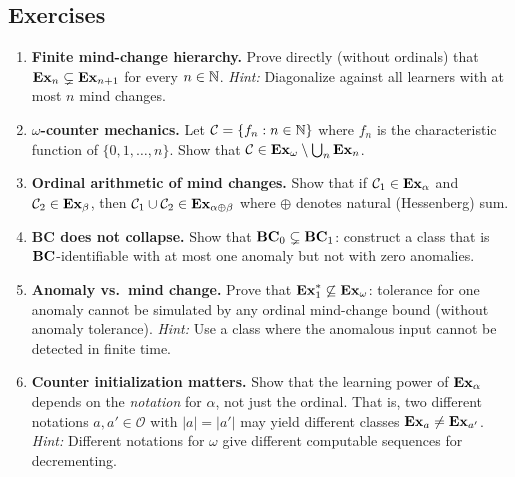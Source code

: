 
\subsection*{Exercises}

\begin{enumerate}[leftmargin=*,itemsep=4pt]

\item \textbf{Finite mind-change hierarchy.}
  Prove directly (without ordinals) that $\mathbf{Ex}_n \subsetneq \mathbf{Ex}_{n+1}$
  for every $n \in \mathbb{N}$.  \emph{Hint:} Diagonalize against all learners
  with at most $n$ mind changes.

\item \textbf{$\omega$-counter mechanics.}
  Let $\mathcal{C} = \{f_n : n \in \mathbb{N}\}$ where $f_n$ is the
  characteristic function of $\{0, 1, \ldots, n\}$.  Show that
  $\mathcal{C} \in \mathbf{Ex}_\omega \setminus \bigcup_n \mathbf{Ex}_n$.

\item \textbf{Ordinal arithmetic of mind changes.}
  Show that if $\mathcal{C}_1 \in \mathbf{Ex}_\alpha$ and
  $\mathcal{C}_2 \in \mathbf{Ex}_\beta$, then
  $\mathcal{C}_1 \cup \mathcal{C}_2 \in \mathbf{Ex}_{\alpha \oplus \beta}$
  where $\oplus$ denotes natural (Hessenberg) sum.

\item \textbf{BC does not collapse.}
  Show that $\mathbf{BC}_0 \subsetneq \mathbf{BC}_1$: construct a class that is
  $\mathbf{BC}$-identifiable with at most one anomaly but not with zero
  anomalies.

\item \textbf{Anomaly vs.\ mind change.}
  Prove that $\mathbf{Ex}_1^* \not\subseteq \mathbf{Ex}_\omega$: tolerance for one
  anomaly cannot be simulated by any ordinal mind-change bound (without
  anomaly tolerance).  \emph{Hint:} Use a class where the anomalous
  input cannot be detected in finite time.

\item \textbf{Counter initialization matters.}
  Show that the learning power of $\mathbf{Ex}_\alpha$ depends on the
  \emph{notation} for $\alpha$, not just the ordinal.  That is,
  two different notations $a, a' \in \mathcal{O}$ with $|a| = |a'|$
  may yield different classes $\mathbf{Ex}_a \neq \mathbf{Ex}_{a'}$.
  \emph{Hint:} Different notations for $\omega$ give different
  computable sequences for decrementing.

\end{enumerate}

